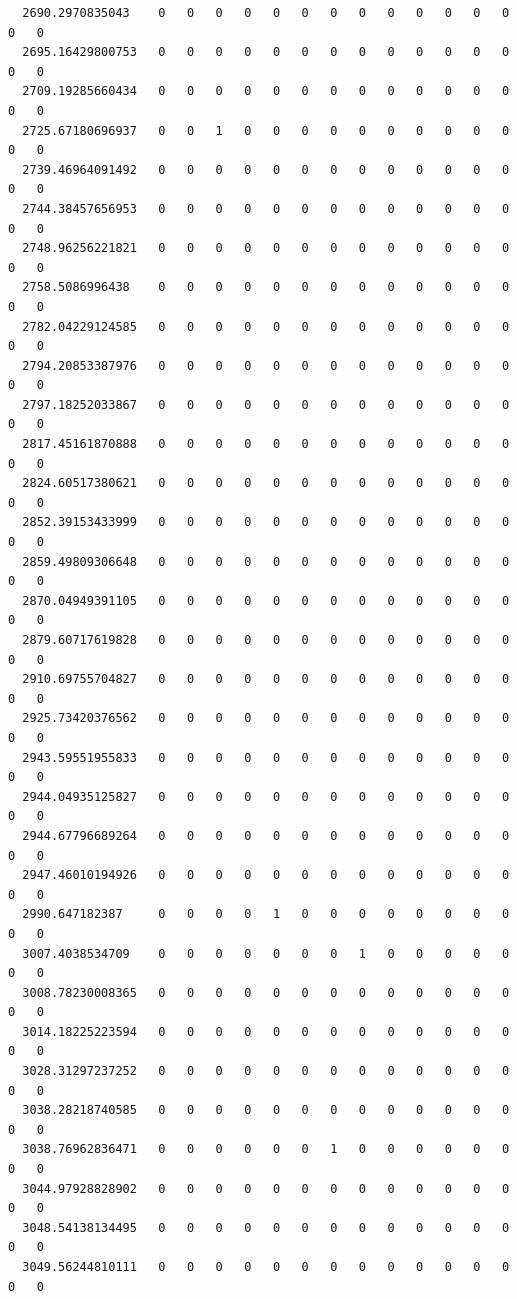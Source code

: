 \documentclass[
  letterpaper,
  DIV=11,
  numbers=noendperiod]{scrartcl}
\begin{document}
\begin{verbatim}
  2690.2970835043    0   0   0   0   0   0   0   0   0   0   0   0   0   0   0
  2695.16429800753   0   0   0   0   0   0   0   0   0   0   0   0   0   0   0
  2709.19285660434   0   0   0   0   0   0   0   0   0   0   0   0   0   0   0
  2725.67180696937   0   0   1   0   0   0   0   0   0   0   0   0   0   0   0
  2739.46964091492   0   0   0   0   0   0   0   0   0   0   0   0   0   0   0
  2744.38457656953   0   0   0   0   0   0   0   0   0   0   0   0   0   0   0
  2748.96256221821   0   0   0   0   0   0   0   0   0   0   0   0   0   0   0
  2758.5086996438    0   0   0   0   0   0   0   0   0   0   0   0   0   0   0
  2782.04229124585   0   0   0   0   0   0   0   0   0   0   0   0   0   0   0
  2794.20853387976   0   0   0   0   0   0   0   0   0   0   0   0   0   0   0
  2797.18252033867   0   0   0   0   0   0   0   0   0   0   0   0   0   0   0
  2817.45161870888   0   0   0   0   0   0   0   0   0   0   0   0   0   0   0
  2824.60517380621   0   0   0   0   0   0   0   0   0   0   0   0   0   0   0
  2852.39153433999   0   0   0   0   0   0   0   0   0   0   0   0   0   0   0
  2859.49809306648   0   0   0   0   0   0   0   0   0   0   0   0   0   0   0
  2870.04949391105   0   0   0   0   0   0   0   0   0   0   0   0   0   0   0
  2879.60717619828   0   0   0   0   0   0   0   0   0   0   0   0   0   0   0
  2910.69755704827   0   0   0   0   0   0   0   0   0   0   0   0   0   0   0
  2925.73420376562   0   0   0   0   0   0   0   0   0   0   0   0   0   0   0
  2943.59551955833   0   0   0   0   0   0   0   0   0   0   0   0   0   0   0
  2944.04935125827   0   0   0   0   0   0   0   0   0   0   0   0   0   0   0
  2944.67796689264   0   0   0   0   0   0   0   0   0   0   0   0   0   0   0
  2947.46010194926   0   0   0   0   0   0   0   0   0   0   0   0   0   0   0
  2990.647182387     0   0   0   0   1   0   0   0   0   0   0   0   0   0   0
  3007.4038534709    0   0   0   0   0   0   0   1   0   0   0   0   0   0   0
  3008.78230008365   0   0   0   0   0   0   0   0   0   0   0   0   0   0   0
  3014.18225223594   0   0   0   0   0   0   0   0   0   0   0   0   0   0   0
  3028.31297237252   0   0   0   0   0   0   0   0   0   0   0   0   0   0   0
  3038.28218740585   0   0   0   0   0   0   0   0   0   0   0   0   0   0   0
  3038.76962836471   0   0   0   0   0   0   1   0   0   0   0   0   0   0   0
  3044.97928828902   0   0   0   0   0   0   0   0   0   0   0   0   0   0   0
  3048.54138134495   0   0   0   0   0   0   0   0   0   0   0   0   0   0   0
  3049.56244810111   0   0   0   0   0   0   0   0   0   0   0   0   0   0   0

\end{verbatim}
\end{document}

